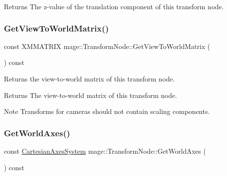 \begin{DoxyReturn}{Returns}
The z-\/value of the translation component of this transform node. 
\end{DoxyReturn}
\hypertarget{structmage_1_1_transform_node_a16586bae5004e22d543b1b931407f603}{}\label{structmage_1_1_transform_node_a16586bae5004e22d543b1b931407f603} 
\subsubsection{\texorpdfstring{Get\+View\+To\+World\+Matrix()}{GetViewToWorldMatrix()}}
{\footnotesize\ttfamily const X\+M\+M\+A\+T\+R\+IX mage\+::\+Transform\+Node\+::\+Get\+View\+To\+World\+Matrix (\begin{DoxyParamCaption}{ }\end{DoxyParamCaption}) const\hspace{0.3cm}{\ttfamily [noexcept]}}

Returns the view-\/to-\/world matrix of this transform node.

\begin{DoxyReturn}{Returns}
The view-\/to-\/world matrix of this transform node. 
\end{DoxyReturn}
\begin{DoxyNote}{Note}
Transforms for cameras should not contain scaling components. 
\end{DoxyNote}
\hypertarget{structmage_1_1_transform_node_aca4f35bb8aaffabc8c825133a7a307e9}{}\label{structmage_1_1_transform_node_aca4f35bb8aaffabc8c825133a7a307e9} 
\subsubsection{\texorpdfstring{Get\+World\+Axes()}{GetWorldAxes()}}
{\footnotesize\ttfamily const \hyperlink{structmage_1_1_cartesian_axes_system}{Cartesian\+Axes\+System} mage\+::\+Transform\+Node\+::\+Get\+World\+Axes (\begin{DoxyParamCaption}{ }\end{DoxyParamCaption}) const\hspace{0.3cm}{\ttfamily [noexcept]}}

